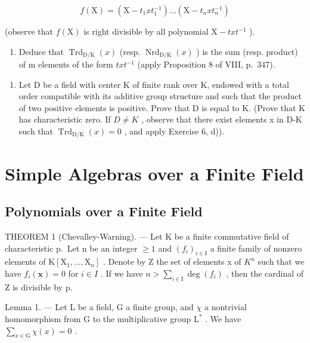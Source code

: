 \[
f (\mathrm{X}) = \left(\mathrm{X} - t _ {1} x t _ {1} ^ {- 1}\right) \dots \left(\mathrm{X} - t _ {n} x t _ {n} ^ {- 1}\right)
\]

(observe that \(f(\mathrm{X})\) is right divisible by all polynomial \(\mathrm{X} - txt^{-1}\) ).

\begin{enumerate}
\def\labelenumi{\alph{enumi})}
\setcounter{enumi}{3}
\tightlist
\item
  Deduce that \(\operatorname{Trd}_{\mathrm{D}/\mathrm{K}}(x)\) (resp. \(\operatorname{Nrd}_{\mathrm{D}/\mathrm{K}}(x)\) ) is the sum (resp. product) of m elements of the form \(txt^{-1}\) (apply Proposition 8 of VIII, p.~347).
\end{enumerate}

\begin{enumerate}
\def\labelenumi{\arabic{enumi})}
\setcounter{enumi}{6}
\tightlist
\item
  Let D be a field with center K of finite rank over K, endowed with a total order compatible with its additive group structure and such that the product of two positive elements is positive. Prove that D is equal to K. (Prove that K has characteristic zero. If \(D \neq K\) , observe that there exist elements x in D-K such that \(\operatorname{Trd}_{\mathrm{D}/\mathrm{K}}(x) = 0\) , and apply Exercise 6, d)).
\end{enumerate}

\section{Simple Algebras over a Finite Field}

\subsection{Polynomials over a Finite Field}

THEOREM 1 (Chevalley-Warning). --- Let K be a finite commutative field of characteristic p.~Let n be an integer \(\geqslant 1\) and \((f_{i})_{i\in\mathrm{I}}\) a finite family of nonzero elements of \(\mathrm{K}[\mathrm{X}_{1},\ldots,\mathrm{X}_{n}]\) . Denote by Z the set of elements x of \(K^{n}\) such that we have \(f_{i}(\mathbf{x})=0\) for \(i\in I\) . If we have \(n>\sum_{i\in\mathrm{I}}\deg(f_{i})\) , then the cardinal of Z is divisible by p.

Lemma 1. --- Let L be a field, G a finite group, and \(\chi\) a nontrivial homomorphism from G to the multiplicative group \(\mathrm{L}^*\) . We have \(\sum_{x\in \mathrm{G}}\chi (x) = 0\) .

